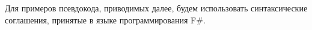 Для примеров псевдокода, приводимых далее, будем использовать синтаксические соглашения, принятые в языке программирования F\#.



	
	
	

